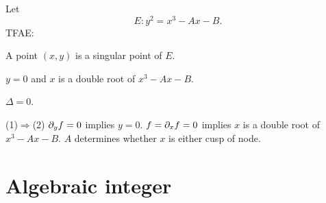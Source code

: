 \documentclass[11pt]{article}
\let\realsection\section
\renewcommand\section{\newpage\realsection}
\begin{document}
\begin{thm}
Let
\[E:y^2=x^3-Ax-B.\]
TFAE:
\begin{cond}
\item A point $(x,y)$ is a singular point of $E$.
\item $y=0$ and $x$ is a double root of $x^3-Ax-B$.
\item $\Delta=0$.
\end{cond}
\end{thm}
\begin{pf}
(1)$\Rightarrow$(2)
$\pd_yf=0$ implies $y=0$. $f=\pd_xf=0$ implies $x$ is a double root of $x^3-Ax-B$.
$A$ determines whether $x$ is either cusp of node.
\end{pf}












































\section{Algebraic integer}
\end{document}
